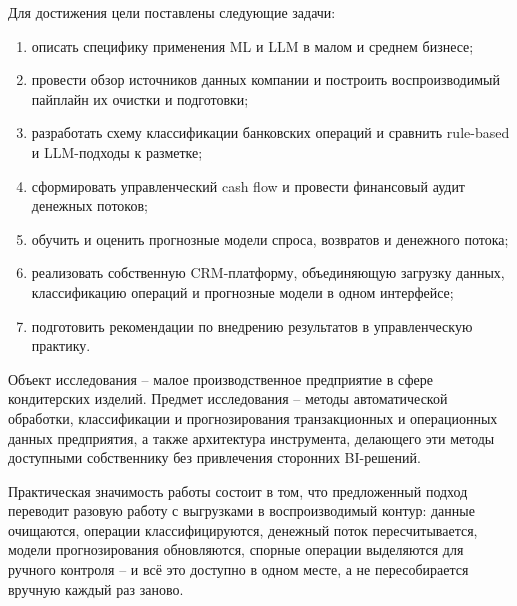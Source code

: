 Для достижения цели поставлены следующие задачи:
\begin{enumerate}
  \item описать специфику применения ML и LLM в малом и среднем бизнесе;
  \item провести обзор источников данных компании и построить воспроизводимый пайплайн их очистки и подготовки;
  \item разработать схему классификации банковских операций и сравнить rule-based и LLM-подходы к разметке;
  \item сформировать управленческий cash flow и провести финансовый аудит денежных потоков;
  \item обучить и оценить прогнозные модели спроса, возвратов и денежного потока;
  \item реализовать собственную CRM-платформу, объединяющую загрузку данных, классификацию операций и прогнозные модели в одном интерфейсе;
  \item подготовить рекомендации по внедрению результатов в управленческую практику.
\end{enumerate}

Объект исследования -- малое производственное предприятие в сфере кондитерских изделий. Предмет исследования -- методы автоматической обработки, классификации и прогнозирования транзакционных и операционных данных предприятия, а также архитектура инструмента, делающего эти методы доступными собственнику без привлечения сторонних BI-решений.

Практическая значимость работы состоит в том, что предложенный подход переводит разовую работу с выгрузками в воспроизводимый контур: данные очищаются, операции классифицируются, денежный поток пересчитывается, модели прогнозирования обновляются, спорные операции выделяются для ручного контроля -- и всё это доступно в одном месте, а не пересобирается вручную каждый раз заново.
